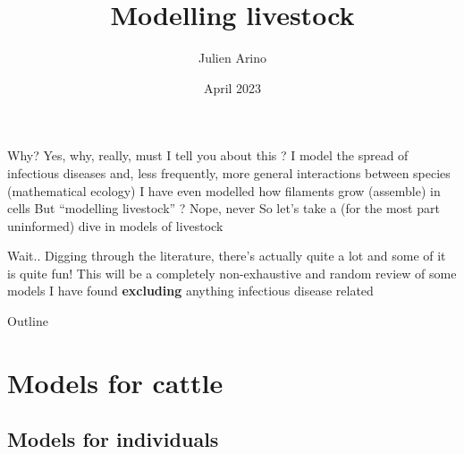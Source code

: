 \documentclass[aspectratio=43]{beamer}
\title{Modelling livestock}
\author{Julien Arino}
\date{April 2023}
\begin{document}

\begin{frame}
  \titlepage
\end{frame}
\addtocounter{page}{-1}





\begin{frame}{Why?}
    Yes, why, really, must I tell you about this ?
    \vfill
    I model the spread of infectious diseases and, less frequently, more general interactions between species (mathematical ecology)
    \vfill
    I have even modelled how filaments grow (assemble) in cells
    \vfill
    But ``modelling livestock'' ? Nope, never
    \vfill
    So let's take a (for the most part uninformed) dive in models of livestock
\end{frame}

\begin{frame}{Wait..}
    Digging through the literature, there's actually quite a lot and some of it is quite fun!
    \vfill
    This will be a completely non-exhaustive and random review of some models I have found \textbf{excluding} anything infectious disease related
\end{frame}


\begin{frame}{Outline}
    \tableofcontents[hideallsubsections]
\end{frame}

\section{Models for cattle}

\subsection{Models for individuals}
\end{document}
